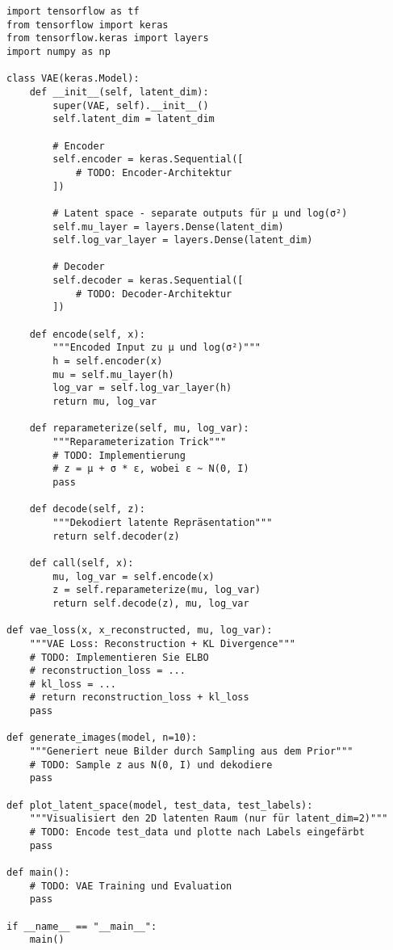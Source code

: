 \documentclass[12pt,a4paper]{article}
\begin{document}
\begin{lstlisting}[caption=VAE für MNIST]
import tensorflow as tf
from tensorflow import keras
from tensorflow.keras import layers
import numpy as np

class VAE(keras.Model):
    def __init__(self, latent_dim):
        super(VAE, self).__init__()
        self.latent_dim = latent_dim
        
        # Encoder
        self.encoder = keras.Sequential([
            # TODO: Encoder-Architektur
        ])
        
        # Latent space - separate outputs für μ und log(σ²)
        self.mu_layer = layers.Dense(latent_dim)
        self.log_var_layer = layers.Dense(latent_dim)
        
        # Decoder
        self.decoder = keras.Sequential([
            # TODO: Decoder-Architektur
        ])
    
    def encode(self, x):
        """Encoded Input zu μ und log(σ²)"""
        h = self.encoder(x)
        mu = self.mu_layer(h)
        log_var = self.log_var_layer(h)
        return mu, log_var
    
    def reparameterize(self, mu, log_var):
        """Reparameterization Trick"""
        # TODO: Implementierung
        # z = μ + σ * ε, wobei ε ~ N(0, I)
        pass
    
    def decode(self, z):
        """Dekodiert latente Repräsentation"""
        return self.decoder(z)
    
    def call(self, x):
        mu, log_var = self.encode(x)
        z = self.reparameterize(mu, log_var)
        return self.decode(z), mu, log_var

def vae_loss(x, x_reconstructed, mu, log_var):
    """VAE Loss: Reconstruction + KL Divergence"""
    # TODO: Implementieren Sie ELBO
    # reconstruction_loss = ...
    # kl_loss = ...
    # return reconstruction_loss + kl_loss
    pass

def generate_images(model, n=10):
    """Generiert neue Bilder durch Sampling aus dem Prior"""
    # TODO: Sample z aus N(0, I) und dekodiere
    pass

def plot_latent_space(model, test_data, test_labels):
    """Visualisiert den 2D latenten Raum (nur für latent_dim=2)"""
    # TODO: Encode test_data und plotte nach Labels eingefärbt
    pass

def main():
    # TODO: VAE Training und Evaluation
    pass

if __name__ == "__main__":
    main()
\end{lstlisting}
\end{document}
